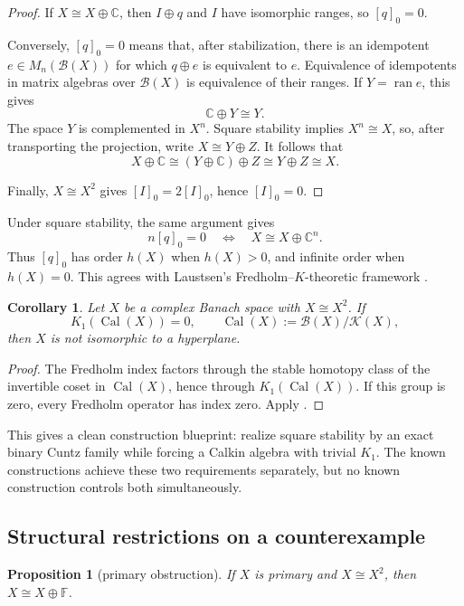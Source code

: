 \documentclass[11pt]{article}
\newtheorem{proposition}[theorem]{Proposition}
\newtheorem{corollary}[theorem]{Corollary}
\theoremstyle{definition}
\theoremstyle{remark}
\newcommand{\F}{\mathbb F}
\newcommand{\K}{\mathcal K}
\newcommand{\B}{\mathcal B}
\newcommand{\Cal}{\operatorname{Cal}}
\begin{document}
\begin{proof}
If $X\cong X\oplus\mathbb C$, then $I\oplus q$ and $I$ have isomorphic ranges,
so $[q]_0=0$.

Conversely, $[q]_0=0$ means that, after stabilization, there is an
idempotent $e\in M_n(\B(X))$ for which $q\oplus e$ is equivalent to $e$.
Equivalence of idempotents in matrix algebras over $\B(X)$ is equivalence of
their ranges.  If $Y=\operatorname{ran}e$, this gives
\[
 \mathbb C\oplus Y\cong Y.
\]
The space $Y$ is complemented in $X^n$.  Square stability implies
$X^n\cong X$, so, after transporting the projection, write $X\cong Y\oplus Z$.
It follows that
\[
 X\oplus\mathbb C\cong (Y\oplus\mathbb C)\oplus Z
 \cong Y\oplus Z\cong X.
\]

Finally, $X\cong X^2$ gives $[I]_0=2[I]_0$, hence $[I]_0=0$.
\end{proof}

Under square stability, the same argument gives
\[
 n[q]_0=0\quad\Longleftrightarrow\quad X\cong X\oplus\mathbb C^n.
\]
Thus $[q]_0$ has order $h(X)$ when $h(X)>0$, and infinite order when
$h(X)=0$.  This agrees with Laustsen's Fredholm--$K$-theoretic framework
\cite{Laustsen1999}.

\begin{corollary}\label{cor:calkin-k1}
Let $X$ be a complex Banach space with $X\cong X^2$.  If
\[
 K_1(\Cal(X))=0,
 \qquad \Cal(X):=\B(X)/\K(X),
\]
then $X$ is not isomorphic to a hyperplane.
\end{corollary}

\begin{proof}
The Fredholm index factors through the stable homotopy class of the invertible
coset in $\Cal(X)$, hence through $K_1(\Cal(X))$.  If this group is zero, every
Fredholm operator has index zero.  Apply .
\end{proof}

This gives a clean construction blueprint: realize square stability by an exact
binary Cuntz family while forcing a Calkin algebra with trivial $K_1$.  The
known constructions achieve these two requirements separately, but no known
construction controls both simultaneously.

\subsection{Structural restrictions on a counterexample}

\begin{proposition}[primary obstruction]\label{prop:primary}
If $X$ is primary and $X\cong X^2$, then $X\cong X\oplus\F$.
\end{proposition}
\end{document}
